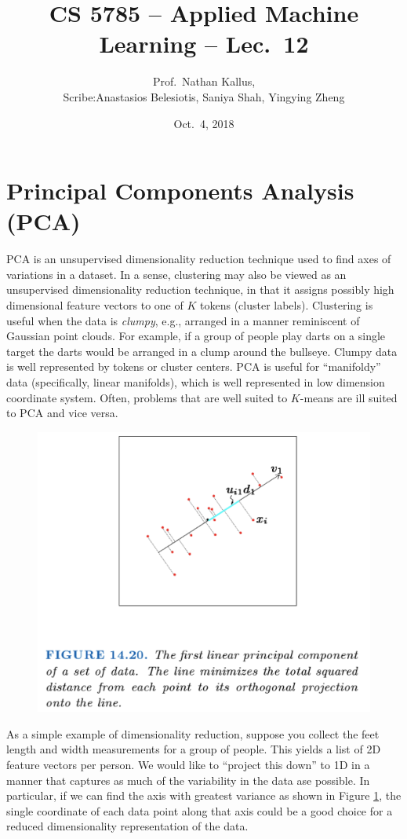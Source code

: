 \documentclass[a4paper]{article}
\title{CS 5785 -- Applied Machine Learning -- Lec.\ 12}
\author{Prof.\ Nathan Kallus, \\Scribe:Anastasios Belesiotis, Saniya Shah, Yingying Zheng}
\date{Oct.\ 4, 2018}
\begin{document}
\maketitle

\section{Principal Components Analysis (PCA)}
PCA is an unsupervised dimensionality reduction technique used to find axes of variations in a dataset.  In a sense, clustering may also be viewed as an unsupervised dimensionality reduction technique, in that it assigns possibly high dimensional feature vectors to one of $K$ tokens (cluster labels). Clustering is useful when the data is \textit{clumpy}, e.g., arranged in a manner reminiscent of Gaussian point clouds. For example, if a group of people play darts on a single target the darts would be arranged in a clump around the bullseye. Clumpy data is well represented by tokens or cluster centers. PCA is useful for ``manifoldy'' data (specifically, linear manifolds), which is well represented in low dimension coordinate system.  Often, problems that are well suited to $K$-means are ill suited to PCA and vice versa.

\begin{figure}
\centering
\includegraphics[width=1.0\textwidth]{TwoDimReduction.png}
\caption{\label{fig:2DimReduction} }
\end{figure}

As a simple example of dimensionality reduction, suppose you collect the feet length and width measurements for a group of people.  This yields a list of 2D feature vectors per person.  We would like to ``project this down'' to 1D in a manner that captures as much of the variability in the data ase possible.  In particular, if we can find the axis with greatest variance
as shown in Figure \ref{fig:2DimReduction}, the single coordinate of each data point along that axis could be a good choice for a reduced dimensionality representation of the data.
\end{document}
